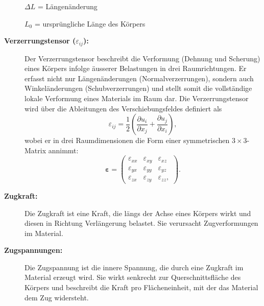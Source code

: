 \begin{description}
	$\Delta L$ = Längenänderung
	
	$L_0$ = ursprüngliche Länge des Körpers
	
\item[\textbf{Verzerrungstensor ($\varepsilon_{ij}$):}]
Der Verzerrungstensor beschreibt die Verformung (Dehnung und Scherung)
eines Körpers infolge äusserer Belastungen in drei Raumrichtungen.
%
Er erfasst nicht nur Längenänderungen (Normalverzerrungen), sondern
auch Winkeländerungen (Schubverzerrungen) und stellt somit die
%
vollständige lokale Verformung eines Materials im Raum dar.
Die Verzerrungstensor wird über die Ableitungen des Verschiebungsfeldes
definiert als
	\begin{equation*}
		\varepsilon_{ij} = 
		\frac{1}{2} \left( \frac{\partial u_i}{\partial x_j} + \frac{\partial u_j}{\partial x_i} \right),
	\end{equation*}
	wobei er in drei Raumdimensionen die Form einer symmetrischen
	$3\times 3$-Matrix annimmt:
	\begin{equation*}
		\boldsymbol{\varepsilon} =
		\begin{pmatrix}
			\varepsilon_{xx} & \varepsilon_{xy} & \varepsilon_{xz} \\
			\varepsilon_{yx} & \varepsilon_{yy} & \varepsilon_{yz} \\
			\varepsilon_{zx} & \varepsilon_{zy} & \varepsilon_{zz},
		\end{pmatrix}.
	\end{equation*}
\item[\textbf{Zugkraft:}]
Die Zugkraft ist eine Kraft, die längs der Achse eines Körpers wirkt
%
und diesen in Richtung Verlängerung belastet.
Sie verursacht Zugverformungen im Material.
%
	
\item[\textbf{Zugspannungen:}]
Die Zugspannung ist die innere Spannung, die durch eine Zugkraft
%
im Material erzeugt wird.
Sie wirkt senkrecht zur Querschnittsfläche des Körpers und beschreibt
die Kraft pro Flächeneinheit, mit der das Material dem Zug widersteht.
\end{description}

